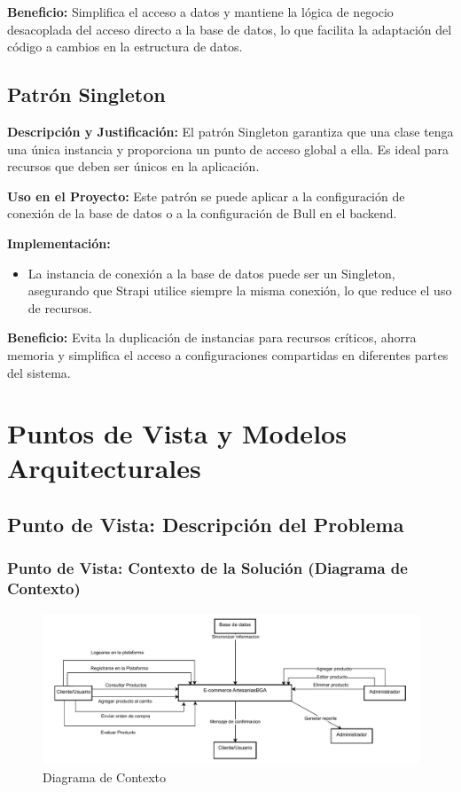 \documentclass[12pt]{article}
\begin{document}
\textbf{Beneficio:} Simplifica el acceso a datos y mantiene la lógica de negocio desacoplada del acceso directo a la base de datos, lo que facilita la adaptación del código a cambios en la estructura de datos.

\subsection{Patrón Singleton}
\textbf{Descripción y Justificación:} El patrón Singleton garantiza que una clase tenga una única instancia y proporciona un punto de acceso global a ella. Es ideal para recursos que deben ser únicos en la aplicación.

\textbf{Uso en el Proyecto:} Este patrón se puede aplicar a la configuración de conexión de la base de datos o a la configuración de Bull en el backend.

\textbf{Implementación:}
\begin{itemize}
    \item La instancia de conexión a la base de datos puede ser un Singleton, asegurando que Strapi utilice siempre la misma conexión, lo que reduce el uso de recursos.
\end{itemize}

\textbf{Beneficio:} Evita la duplicación de instancias para recursos críticos, ahorra memoria y simplifica el acceso a configuraciones compartidas en diferentes partes del sistema.
\section{Puntos de Vista y Modelos Arquitecturales}

\subsection{Punto de Vista: Descripción del Problema}
\subsubsection{Punto de Vista: Contexto de la Solución (Diagrama de Contexto)}
\begin{figure}[H]
    \centering
    \includegraphics[width=\textwidth]{img/Diagrama de contexto.pdf}
    \caption{Diagrama de Contexto}
    \label{fig:diagrama_contexto}
\end{figure}
\end{document}
